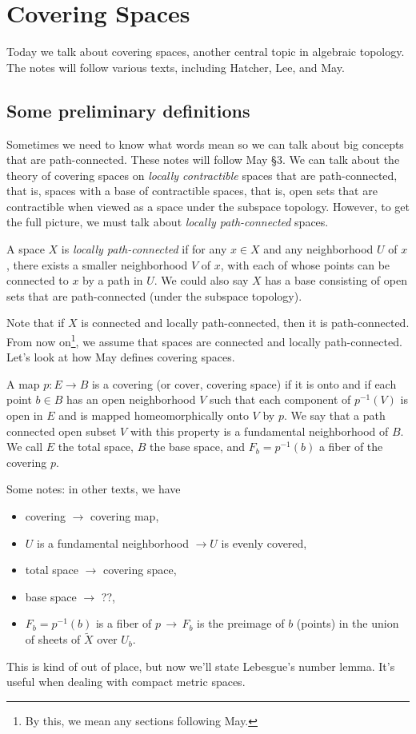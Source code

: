 \section{Covering Spaces}
Today we talk about covering spaces, another central topic in algebraic topology. The notes will follow various texts, including Hatcher, Lee, and May.
\orbreak
\subsection{Some preliminary definitions}
Sometimes we need to know what words mean so we can talk about big concepts that are path-connected. These notes will follow May \S 3. We can talk about the theory of covering spaces on \emph{locally contractible} spaces that are path-connected, that is, spaces with a base of contractible spaces, that is, open sets that are contractible when viewed as a space under the subspace topology. However, to get the full picture, we must talk about \emph{locally path-connected} spaces. 
\begin{definition}
    A space $X$ is \emph{locally path-connected} if for any $x\in X$ and any neighborhood $U$ of $x$, there exists a smaller neighborhood $V$ of $x$, with each of whose points can be connected to $x$ by a path in $U$. We could also say $X$ has a base consisting of open sets that are path-connected (under the subspace topology).
\end{definition}
Note that if $X$ is connected and locally path-connected, then it is path-connected. From now on\footnote{By this, we mean any sections following May.}, we assume that spaces are connected and locally path-connected. Let's look at how May defines covering spaces.
\begin{definition}
    A map $p \colon E \to B$ is a covering (or cover, covering space) if it is onto and if each point $b\in B$ has an open neighborhood $V$ such that each component of $p^{-1}(V)$ is open in $E$ and is mapped homeomorphically onto $V$ by $p$. We say that a path connected open subset $V$ with this property is a fundamental neighborhood of $B$. We call $E$ the total space, $B$ the base space, and $F_b = p ^{-1}(b)$ a fiber of the covering $p$.
\end{definition}
Some notes: in other texts, we have
\begin{itemize}
    \item covering $\rightarrow $ covering map,
    \item $U$ is a fundamental neighborhood $\rightarrow U$ is evenly covered,
    \item total space $\rightarrow $ covering space,
    \item base space $\rightarrow $ ??,
    \item $F_b=p^{-1}(b)$ is a fiber of $p \,\longrightarrow\, F_b$ is the preimage of $b$ (points) in the union of sheets of $\widetilde X$ over $U_b$.
\end{itemize}   This is kind of out of place, but now we'll state Lebesgue's number lemma. It's useful when dealing with compact metric spaces.
